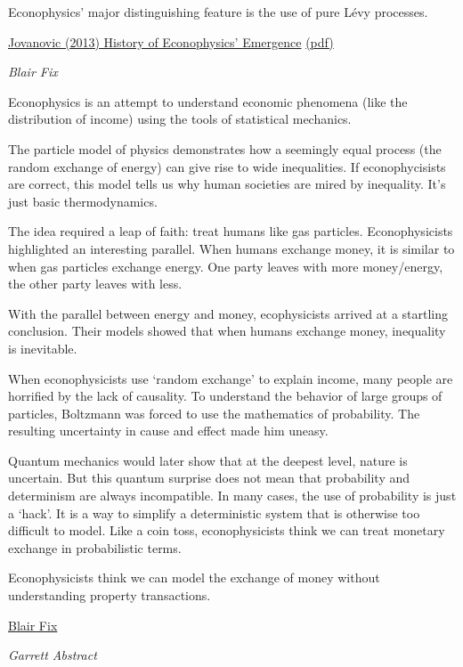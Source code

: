 \documentclass[
]{book}
\begin{document}
Econophysics' major distinguishing feature is the use of pure Lévy processes.

\href{https://papers.ssrn.com/sol3/papers.cfm?abstract_id=3294565}{Jovanovic (2013) History of Econophysics' Emergence}
\href{pdf/Jovanovic_2013_Econophysics_History.pdf}{(pdf)}

\emph{Blair Fix}

Econophysics is an attempt to understand economic phenomena
(like the distribution of income)
using the tools of statistical mechanics.

The particle model of physics demonstrates how a seemingly equal process
(the random exchange of energy)
can give rise to wide inequalities.
If econophycisists are correct,
this model tells us why human societies are mired by inequality.
It's just basic thermodynamics.

The idea required a leap of faith: treat humans like gas particles.
Econophysicists highlighted an interesting parallel.
When humans exchange money, it is similar to when gas particles exchange energy.
One party leaves with more money/energy, the other party leaves with less.

With the parallel between energy and money, ecophysicists arrived at a startling conclusion.
Their models showed that when humans exchange money, inequality is inevitable.

When econophysicists use `random exchange' to explain income,
many people are horrified by the lack of causality.
To understand the behavior of large groups of particles,
Boltzmann was forced to use the mathematics of probability.
The resulting uncertainty in cause and effect made him uneasy.

Quantum mechanics would later show that at the deepest level, nature is uncertain.
But this quantum surprise does not mean that probability and determinism are always incompatible.
In many cases, the use of probability is just a `hack'.
It is a way to simplify a deterministic system that is otherwise too difficult to model.
Like a coin toss, econophysicists think we can treat monetary exchange in probabilistic terms.

Econophysicists think we can model the exchange of money without understanding property transactions.

\href{https://economicsfromthetopdown.com/2021/03/12/energizing-exchange-learning-from-econophysics-mistakes/}{Blair Fix}

\emph{Garrett Abstract}
\end{document}
